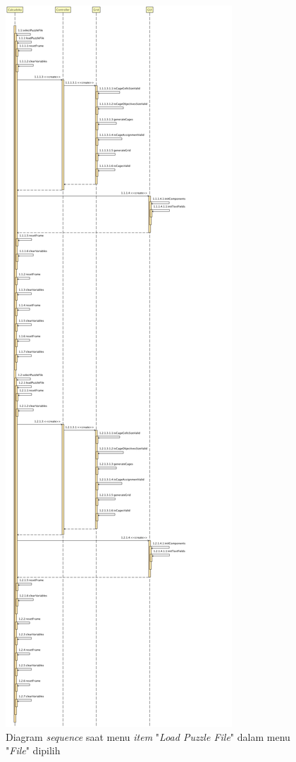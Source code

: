 \begin{figure}
\centering
\captionsetup{justification=centering}
\includegraphics[scale=0.2]{Gambar/Analisis/SequenceDiagramLoad.png}
\caption[Diagram \textit{sequence} saat menu \textit{item} "\textit{Load Puzzle File}" dalam menu "\textit{File}" dipilih]{Diagram \textit{sequence} saat menu \textit{item} "\textit{Load Puzzle File}" dalam menu "\textit{File}" dipilih}
\label{fig:sequenceload}
\end{figure}

